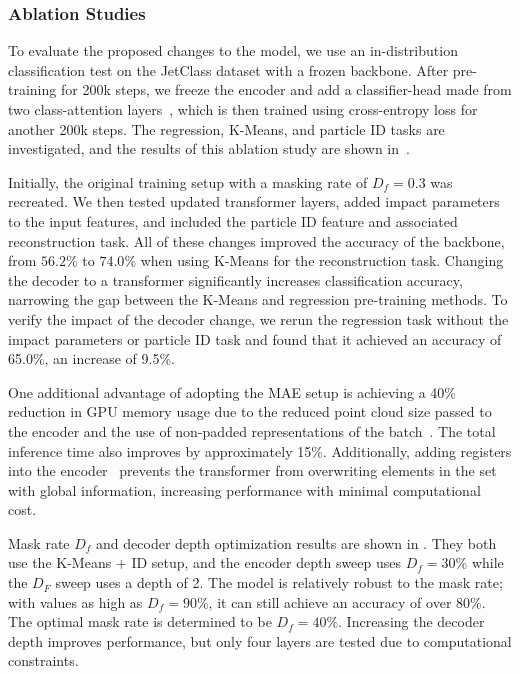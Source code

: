 \subsubsection{Ablation Studies}

To evaluate the proposed changes to the model, we use an in-distribution classification test on the JetClass dataset with a frozen backbone.
After pre-training for 200k steps, we freeze the encoder and add a classifier-head made from two class-attention layers~\cite{GoingDeeper}, which is then trained using cross-entropy loss for another 200k steps.
The regression, K-Means, and particle ID tasks are investigated, and the results of this ablation study are shown in~.

Initially, the original training setup with a masking rate of $D_f=0.3$ was recreated.
We then tested updated transformer layers, added impact parameters to the input features, and included the particle ID feature and associated reconstruction task.
All of these changes improved the accuracy of the backbone, from $56.2\%$ to $74.0\%$ when using K-Means for the reconstruction task.
Changing the decoder to a transformer significantly increases classification accuracy, narrowing the gap between the K-Means and regression pre-training methods.
To verify the impact of the decoder change, we rerun the regression task without the impact parameters or particle ID task and found that it achieved an accuracy of 65.0\%, an increase of 9.5\%.

One additional advantage of adopting the MAE setup is achieving a 40\% reduction in GPU memory usage due to the reduced point cloud size passed to the encoder and the use of non-padded representations of the batch~\cite{FlashAttentionFastMemoryEfficient}.
The total inference time also improves by approximately 15\%.
Additionally, adding registers into the encoder~\cite{VisionTransformersNeed} prevents the transformer from overwriting elements in the set with global information, increasing performance with minimal computational cost.

Mask rate $D_f$ and decoder depth optimization results are shown in .
They both use the K-Means + ID setup, and the encoder depth sweep uses $D_f=30\%$ while the $D_F$ sweep uses a depth of 2.
The model is relatively robust to the mask rate; with values as high as $D_f=90\%$, it can still achieve an accuracy of over 80\%.
The optimal mask rate is determined to be $D_f=40\%$.
Increasing the decoder depth improves performance, but only four layers are tested due to computational constraints.

